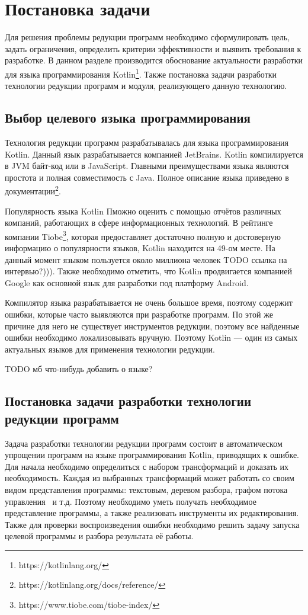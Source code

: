 \chapter{Постановка задачи}
Для решения проблемы редукции программ необходимо сформулировать цель, задать ограничения, определить критерии эффективности и выявить требования к разработке. В данном разделе производится обоснование актуальности разработки для языка программирования Kotlin\footnote{https://kotlinlang.org/}. Также постановка задачи разработки технологии редукции программ и модуля, реализующего данную технологию.

\section{Выбор целевого языка программирования}
Технология редукции программ разрабатывалась для языка программирования Kotlin. Данный язык разрабатывается компанией JetBrains. Kotlin компилируется в JVM байт-код или в JavaScript. Главными преимуществами языка являются простота и полная совместимость с Java. Полное описание языка приведено в документации\footnote{https://kotlinlang.org/docs/reference/}.

Популярность языка Kotlin Пможно оценить с помощью отчётов раз­личных компаний, работающих в сфере информационных технологий. В рейтинге компании Tiobe\footnote{https://www.tiobe.com/tiobe-index/}, которая предоставляет достаточно полную и достоверную информацию о популярности языков, Kotlin находится на 49-ом месте. На данный момент языком пользуется около миллиона человек 
TODO ссылка на интервью?))). Также необходимо отметить, что Kotlin продвигается компанией Google как основной язык для разработки под платформу Android. 

Компилятор языка разрабатывается не очень большое время, поэтому содержит ошибки, которые часто выявляются при разработке программ. По этой же причине для него не существует инструментов редукции, поэтому все найденные ошибки необходимо локализовывать вручную. Поэтому Kotlin --- один из самых актуальных языков для применения технологии редукции.

TODO мб что-нибудь добавить о языке?
\section{Постановка задачи разработки технологии редукции программ}
Задача разработки технологии редукции программ состоит в автоматическом упрощении программ на языке программирования Kotlin, приводящих к ошибке. Для начала необходимо определиться с набором трансформаций и доказать их необходимость. Каждая из выбранных трансформаций может работать со своим видом представления программы: текстовым, деревом разбора, графом потока управления~\cite{harrold2005representation} и т.д. Поэтому необходимо уметь получать необходимое представление программы, а также реализовать инструменты их редактирования. Также для проверки воспроизведения ошибки необходимо решить задачу запуска целевой программы и разбора результата её работы.

